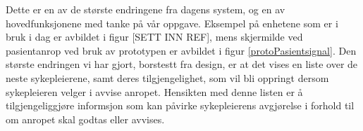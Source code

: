 Dette er en av de største endringene fra dagens system, og en av hovedfunksjonene med tanke på vår oppgave. Eksempel på enhetene som er i bruk i dag er avbildet i figur [SETT INN REF], mens skjermilde ved pasientanrop ved bruk av prototypen er avbildet i figur \ref{protoPasientsignal}. Den største endringen vi har gjort, borstestt fra design, er at det vises en liste over de neste sykepleierene, samt deres tilgjengelighet, som vil bli oppringt dersom sykepleieren velger i avvise anropet. Hensikten med denne listen er å tilgjengeliggjøre informsjon som kan påvirke sykepleierens avgjørelse i forhold til om anropet skal godtas eller avvises.


